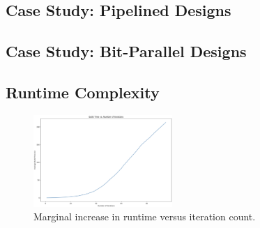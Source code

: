 \subsection{Case Study: Pipelined Designs}\label{sec:results:retiming}

\subsection{Case Study: Bit-Parallel Designs}\label{sec:results:scalability}

\subsection{Runtime Complexity}\label{sec:results:complexity}
\begin{figure}
    \centering
    \includegraphics[width=0.47\textwidth]{img/runtime.png}
    \caption{Marginal increase in runtime versus iteration count.}\label{fig:runtime}
    \Description[]{}
\end{figure}
